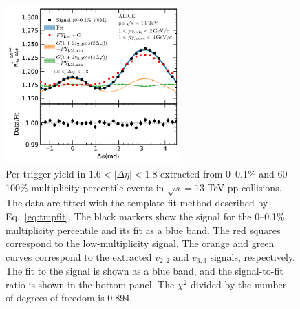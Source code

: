 \begin{figure}[h!]
	\centering
	\hspace{-3em}\includegraphics[width=0.6\textwidth]{figures/Fig1_FlowExt.pdf} 
	\caption{Per-trigger yield in $1.6<|\Delta\eta|<1.8$ extracted from 0--0.1\% and 60--100\% multiplicity percentile events in $\sqrt{s}=13$ TeV pp collisions. The data are fitted with the template fit method described by Eq.~\ref{eq:tmpfit}. The black markers show the signal for the 0--0.1\% multiplicity percentile and its fit as a blue band. The red squares correspond to the low-multiplicity signal. The orange and green curves correspond to the extracted $v_{2,2}$ and $v_{3,3}$ signals, respectively. The fit to the signal is shown as a blue band, and the signal-to-fit ratio is shown in the bottom panel. The $\chi^{2}$ divided by the number of degrees of freedom is 0.894.}
	\label{fig:flowext}
\end{figure}

